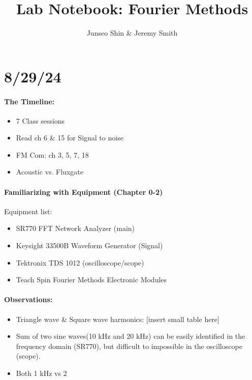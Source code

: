 \documentclass{article}
\author{Junseo Shin \& Jeremy Smith}
\date{}
\title{Lab Notebook: Fourier Methods}
\begin{document}
\maketitle
\tableofcontents
\pagebreak

% 

\section*{8/29/24}

\paragraph*{The Timeline:}
\begin{itemize}
    \item 7 Class sessions
    \item Read ch 6 \& 15 for Signal to noise
    \item FM Com: ch 3, 5, 7, 18
    \item Acoustic vs. Fluxgate
\end{itemize}
\paragraph*{Familiarizing with Equipment (Chapter 0-2)}

Equipment list:
\begin{itemize}
    \item SR770 FFT Network Analyzer (main)
    \item Keysight 33500B Waveform Generator (Signal)
    \item Tektronix TDS 1012 (oscilloscope/scope)
    \item Teach Spin Fourier Methods Electronic Modules
\end{itemize}

\paragraph*{Observations:}
\begin{itemize}
    \item Triangle wave \& Square wave harmonics: [insert small table here]
    \item Sum of two sine waves(10 kHz and 20 kHz) can be easily identified in the frequency domain (SR770), but difficult to impossible in the oscilloscope (scope).
    \item Both 1 kHz vs 2
\end{itemize}
\end{document}
